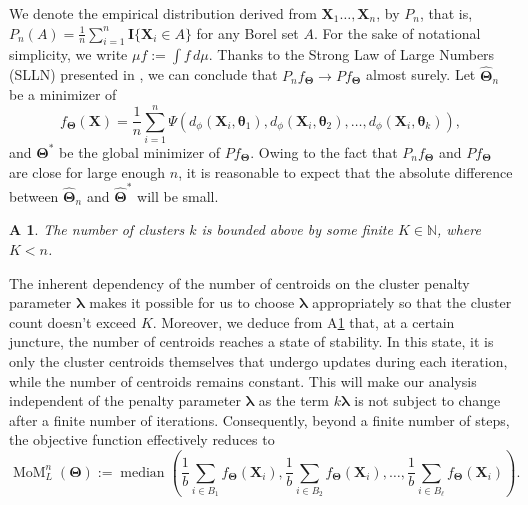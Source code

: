\documentclass[11pt]{article}
\newcommand{\bX}{\boldsymbol{X}}
\newcommand{\bTheta}{\boldsymbol{\Theta}}
\newtheorem{assumption}{A\hspace{-4pt}}
\begin{document}
We denote the empirical distribution derived from $\bX_1\ldots,\bX_n$, by $P_n$, that is, $P_n(A) = \frac{1}{n}\sum_{i=1}^n \mathbf{I}\{\bX_i \in A\}$ for any Borel set $A$. 
For the sake of notational simplicity, we write $\mu f := \int f \, d\mu$. Thanks to the Strong Law of Large Numbers (SLLN) presented in \cite{athreya2006measure}, we can conclude that $P_n f_{\bTheta} \rightarrow Pf_{\bTheta}$ almost surely. Let $\widehat{\bm{\Theta}}_n$ be a minimizer of \[f_{\bm\Theta}(\bm{X})=\frac{1}{n} \sum_{i=1}^n \Psi(d_{\phi}(\bm{X}_i, \bm{\theta}_1), d_{\phi}(\bm{X}_i, \bm{\theta}_2), \ldots, d_{\phi}(\bm{X}_i, \bm{\theta}_k)),\]
and $\bm{\Theta}^*$ be the global minimizer of $Pf_{\bm{\Theta}}$. 
Owing to the fact that $P_n f_{\bm{\Theta}}$ and $P f_{\bTheta}$ are close for large enough $n$, it is reasonable to expect that the absolute difference between $\widehat{\bm{\Theta}}_n$ and $\bm{\widehat{\Theta}}^*$ will be small. %

\begin{assumption}\label{ass-2-cluster-count}
    The number of clusters $k$ is bounded above by some finite $K\in \mathbb{N}$, where $K < n$.
\end{assumption}

The inherent dependency of the number of centroids on the cluster penalty parameter $\bm{\lambda}$ makes it possible for us to choose $\bm{\lambda}$ appropriately so that the cluster count doesn't exceed $K$. Moreover, we deduce from A\ref{ass-2-cluster-count} that, at a certain juncture, the number of centroids reaches a state of stability. In this state, it is only the cluster centroids themselves that undergo updates during each iteration, while the number of centroids remains constant. This will make our analysis independent of the penalty parameter $\bm{\lambda}$ as the term $k\bm{\lambda}$ is not subject to change after a finite number of iterations. Consequently, beyond a finite number of steps, the objective function effectively reduces to 
\begin{equation}\label{DP-MoM-obj}
    \operatorname{MoM}_L^n(\bTheta) := \operatorname{median} \left(\frac{1}{b}\sum_{i\in B_{1}}f_{\bm{\Theta}}(\bm{X}_i), \frac{1}{b}\sum_{i\in B_{2}}f_{\bm{\Theta}}(\bm{X}_i), \ldots, \frac{1}{b}\sum_{i\in B_{\ell}}f_{\bm{\Theta}}(\bm{X}_i)\right).
\end{equation} 
\end{document}
